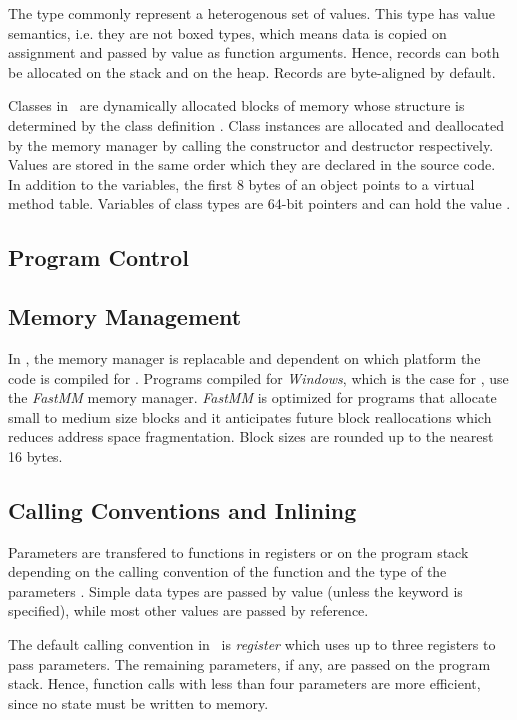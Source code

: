 The  type commonly represent a heterogenous set of values. This type has value semantics, i.e. they are not boxed types, which means data is copied on assignment and passed by value as function arguments. Hence, records can both be allocated on the stack and on the heap. Records are byte-aligned by default.

Classes in \delphi~are dynamically allocated blocks of memory whose structure is determined by the class definition \cite{noauthor_undated-un}. Class instances are allocated and deallocated by the memory manager by calling the constructor and destructor respectively. Values are stored in the same order which they are declared in the source code. In addition to the variables, the first 8 bytes of an object points to a virtual method table. Variables of class types are 64-bit pointers and can hold the value .

\subsection{Program Control}
\label{sub:Program Control}
\subsection{Memory Management}
\label{sub:Memory Management}
In \delphi, the memory manager is replacable and dependent on which platform the code is compiled for \cite{noauthor_undated-ys}. Programs compiled for \textit{Windows}, which is the case for \gap, use the \textit{FastMM} memory manager. \textit{FastMM} is optimized for programs that allocate small to medium size blocks and it anticipates future block reallocations which reduces address space fragmentation. Block sizes are rounded up to the nearest 16 bytes. 


\subsection{Calling Conventions and Inlining}
\label{sub:Calling Conventions and Inlining}
Parameters are transfered to functions in registers or on the program stack depending on the calling convention of the function and the type of the parameters \cite{noauthor_undated-xi}. Simple data types are passed by value (unless the  keyword is specified), while most other values are passed by reference. 

The default calling convention in \delphi~is \textit{register} which uses up to three registers to pass parameters. The remaining parameters, if any, are passed on the program stack. Hence, function calls with less than four parameters are more efficient, since no state must be written to memory.

